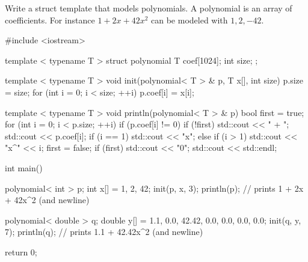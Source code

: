 

\nextq
Write a struct template that models polynomials.
A polynomial is an array of coefficients.
For instance $1 + 2x + 42x^2$ can be modeled with ${1, 2, -42}$.
\\
\ANSWER
\begin{answercode}
#include <iostream>

template < typename T >
struct polynomial
{
    T coef[1024];
    int size;
};

template < typename T >
void init(polynomial< T > & p, T x[], int size)
{
  p.size = size;
  for (int i = 0; i < size; ++i)
  {
    p.coef[i] = x[i];
  }
}

template < typename T >
void println(polynomial< T > & p)
{
  bool first = true;
  for (int i = 0; i < p.size; ++i)
  {
    if (p.coef[i] != 0)
    {
      if (!first)
      {
        std::cout << " + ";
      }
      std::cout << p.coef[i];
      if (i == 1)
      {
        std::cout << "x";
      }
      else if (i > 1)
      {
        std::cout << "x^" << i;
      }
      first = false;
    }
  }
  if (first)
  {
    std::cout << "0";
  }
  std::cout << std::endl;
}

int main()
{
    polynomial< int > p;
    int x[] = {1, 2, 42};
    init(p, x, 3);
    println(p); // prints 1 + 2x + 42x^2 (and newline)

    polynomial< double > q;
    double y[] = {1.1, 0.0, 42.42, 0.0, 0.0, 0.0, 0.0};
    init(q, y, 7);
    println(q); // prints 1.1 + 42.42x^2 (and newline)

    return 0;
}
\end{answercode}


